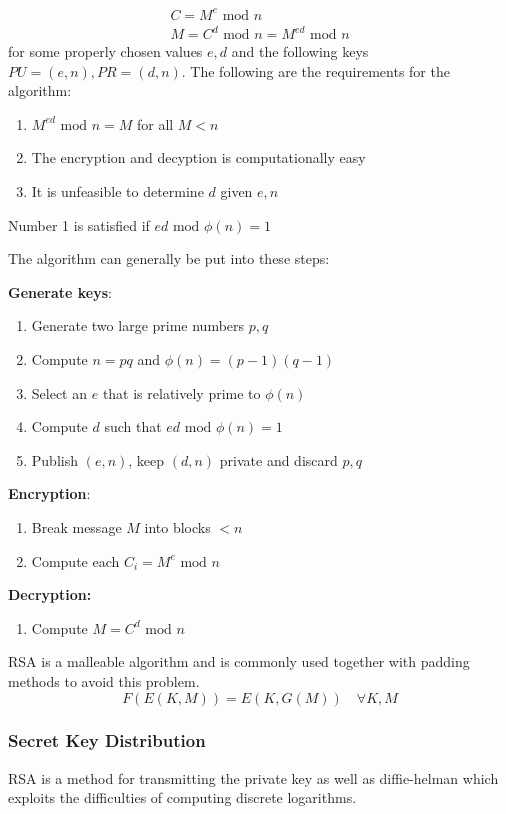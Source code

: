 \documentclass[11pt]{article}
\begin{document}
\begin{gather}
    C = M^e \text{ mod } n \\
    M = C^d \text{ mod } n = M^{ed} \text{ mod } n
\end{gather}
for some properly chosen values $e,d$ and the following keys $PU = (e,n), PR = (d,n)$.
The following are the requirements for the algorithm:
\begin{enumerate}
    \item $M^{ed} \text{ mod } n =M$ for all $M<n$
    \item The encryption and decyption is computationally easy
    \item It is unfeasible to determine $d$ given $e,n$
\end{enumerate}

Number 1 is satisfied if $ed \text{ mod } \phi(n) = 1$

The algorithm can generally be put into these steps:

\textbf{Generate keys}: 
\begin{enumerate}
    \item Generate two large prime numbers $p,q$
    \item Compute $n=pq$ and $\phi(n) = (p-1)(q-1)$
    \item Select an $e$ that is relatively prime to $\phi(n)$
    \item Compute $d$ such that $ed \text{ mod } \phi(n) = 1$
    \item Publish $(e,n)$, keep $(d,n)$ private and discard $p,q$
\end{enumerate}

\textbf{Encryption}:
\begin{enumerate}
    \item Break message $M$ into blocks $<n$
    \item Compute each $C_i = M^e \text{ mod } n$
\end{enumerate}

\textbf{Decryption:}
\begin{enumerate} 
    \item Compute $M = C^d \text{ mod } n$
\end{enumerate}

RSA is a malleable algorithm and is commonly used together with padding methods to avoid this problem.
\begin{equation}
    F(E(K,M)) = E(K,G(M)) \quad \forall K,M
\end{equation}

\subsubsection{Secret Key Distribution}
RSA is a method for transmitting the private key as well as diffie-helman which exploits the difficulties of computing discrete logarithms.
\end{document}

